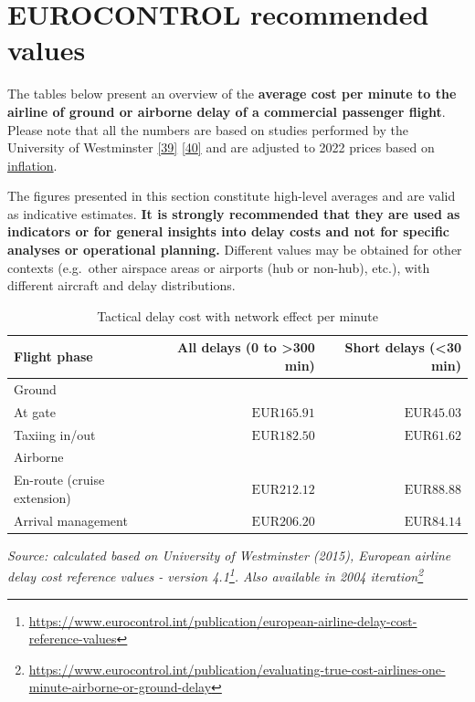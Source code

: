 \documentclass[
  11pt,
  a4paper,
]{book}
\DeclareRobustCommand{\href}[2]{#2\footnote{\url{#1}}}
\begin{document}
\hypertarget{eurocontrol-recommended-values-13}{%
\section{EUROCONTROL recommended
values}\label{eurocontrol-recommended-values-13}}

The tables below present an overview of the \textbf{average cost per
minute to the airline of ground or airborne delay of a commercial
passenger flight}. Please note that all the numbers are based on studies
performed by the University of Westminster
\protect\hyperlink{ref-uow:2004}{{[}39{]}}
\protect\hyperlink{ref-uow:2015}{{[}40{]}} and are adjusted to 2022
prices based on \protect\hyperlink{tbl-inflation-table}{inflation}.

The figures presented in this section constitute high-level averages and
are valid as indicative estimates. \textbf{It is strongly recommended
that they are used as indicators or for general insights into delay
costs and not for specific analyses or operational planning.} Different
values may be obtained for other contexts (e.g.~other airspace areas or
airports (hub or non-hub), etc.), with different aircraft and delay
distributions.

\hypertarget{tbl-delay-cost-tact}{}
\setlength{\LTpost}{0mm}
\begin{longtable}{lrr}
\caption{\label{tbl-delay-cost-tact}Tactical delay cost with network effect per minute }\tabularnewline

\toprule
Flight phase & All delays (0 to >300 min) & Short delays (<30 min) \\ 
\midrule
\multicolumn{3}{l}{Ground} \\ 
\midrule
At gate & $\text{EUR}165.91$ & $\text{EUR}45.03$ \\ 
Taxiing in/out & $\text{EUR}182.50$ & $\text{EUR}61.62$ \\ 
\midrule
\multicolumn{3}{l}{Airborne} \\ 
\midrule
En-route (cruise extension) & $\text{EUR}212.12$ & $\text{EUR}88.88$ \\ 
Arrival management & $\text{EUR}206.20$ & $\text{EUR}84.14$ \\ 
\bottomrule
\end{longtable}
\begin{minipage}{\linewidth}
\emph{Source: calculated based on \href{https://www.eurocontrol.int/publication/european-airline-delay-cost-reference-values}{University of Westminster (2015), European airline delay cost reference values - version 4.1}. Also available in \href{https://www.eurocontrol.int/publication/evaluating-true-cost-airlines-one-minute-airborne-or-ground-delay}{2004 iteration}}\\
\end{minipage}
\end{document}
